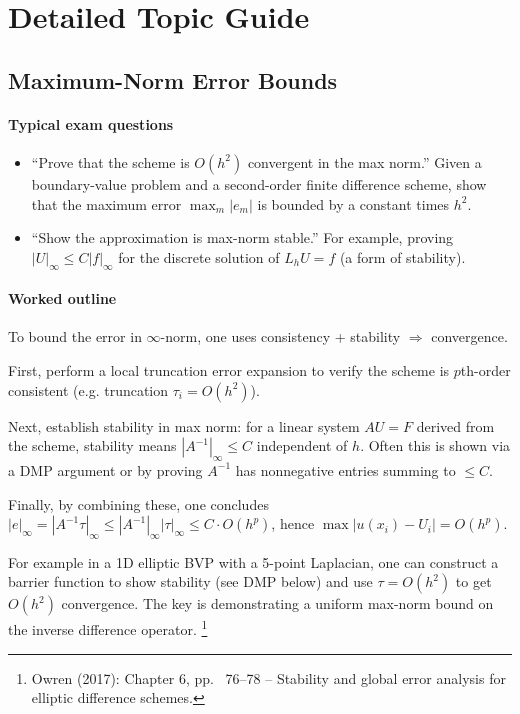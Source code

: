 \documentclass[a4paper,11pt]{article}
\begin{document}
\section{Detailed Topic Guide}

\subsection{Maximum-Norm Error Bounds}
\paragraph{Typical exam questions}
\begin{itemize}
    \item \enquote{Prove that the scheme is $O(h^2)$ convergent in the max norm.} Given a boundary-value problem and a second-order finite difference scheme, show that the maximum error $\max_m |e_m|$ is bounded by a constant times $h^2$.
    \item \enquote{Show the approximation is max-norm stable.} For example, proving $|U|_{\infty} \le C|f|_{\infty}$ for the discrete solution of $L_h U = f$ (a form of stability).
\end{itemize}

\paragraph{Worked outline}
To bound the error in $\infty$-norm, one uses consistency + stability $\Rightarrow$ convergence. 

\begin{description}[style=nextline]
    \item[Consistency:] First, perform a local truncation error expansion to verify the scheme is $p$th-order consistent (e.g. truncation $\tau_i = O(h^2)$). 
    \item[Stability:] Next, establish stability in max norm: for a linear system $A U = F$ derived from the scheme, stability means $|A^{-1}|_{\infty} \le C$ independent of $h$. 
    Often this is shown via a DMP argument or by proving $A^{-1}$ has nonnegative entries summing to $\le C$. 
    \item[Convergence:] Finally, by combining these, one concludes $|e|_{\infty} = |A^{-1}\tau|_{\infty} \le |A^{-1}|_{\infty}|\tau|_{\infty} \le C\cdot O(h^p)$, hence $\max|u(x_i)-U_i|=O(h^p)$. 
\end{description}

For example in a 1D elliptic BVP with a 5-point Laplacian, one can construct a barrier function to show stability (see DMP below) and use $\tau=O(h^2)$ to get $O(h^2)$ convergence. 
The key is demonstrating a uniform max-norm bound on the inverse difference operator.
\footnote{Owren (2017): Chapter 6, pp. ~76--78 -- Stability and global error analysis for elliptic difference schemes.}
\end{document}
